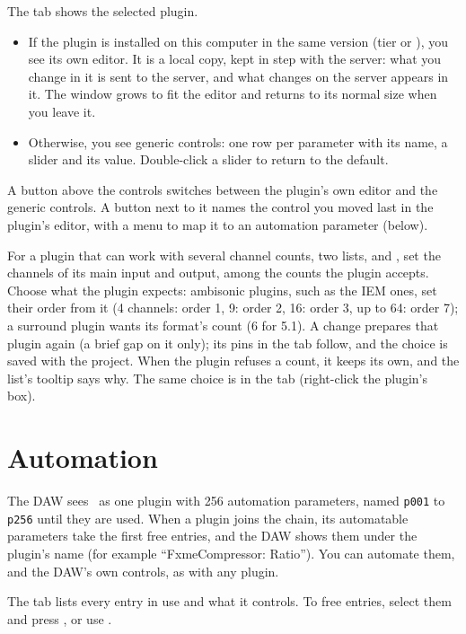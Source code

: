 The tab shows the selected plugin.

\begin{itemize}
  \item If the plugin is installed on this computer in the same version
    (tier  or ), you see its own editor. It is a local copy,
    kept in step with the server: what you change in it is sent to the
    server, and what changes on the server appears in it. The window grows
    to fit the editor and returns to its normal size when you leave it.
  \item Otherwise, you see generic controls: one row per parameter with its
    name, a slider and its value. Double-click a slider to return to the
    default.
\end{itemize}

A button above the controls switches between the plugin's own editor and the
generic controls. A  button next to it names the control you
moved last in the plugin's editor, with a menu to map it to an automation
parameter (below).

For a plugin that can work with several channel counts, two lists,
 and , set the channels of its main input and output,
among the counts the plugin accepts. Choose what the plugin expects:
ambisonic plugins, such as the IEM ones, set their order from it (4
channels: order 1, 9: order 2, 16: order 3, up to 64: order 7); a surround
plugin wants its format's count (6 for 5.1). A change
prepares that plugin again (a brief gap on it only); its pins in the
 tab follow, and the choice is saved with the project. When
the plugin refuses a count, it keeps its own, and the list's tooltip says
why. The same choice is in the  tab (right-click the plugin's
box).

\section{Automation}

The DAW sees \fxme\ as one plugin with 256 automation parameters, named
\texttt{p001} to \texttt{p256} until they are used. When a plugin joins the
chain, its automatable parameters take the first free entries, and the DAW
shows them under the plugin's name (for example ``FxmeCompressor: Ratio'').
You can automate them, and the DAW's own controls, as with any plugin.

The  tab lists every entry in use and what it controls. To free
entries, select them and press , or use .

